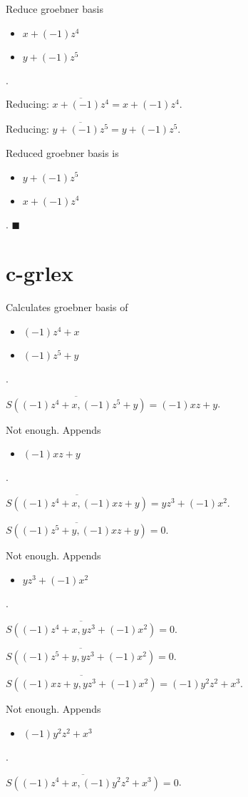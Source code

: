 \documentclass{jsarticle}
\begin{document}
Reduce groebner basis 
\begin{itemize}
\item $x+(-1)z^{4}$
\item $y+(-1)z^{5}$
\end{itemize}  . 


Reducing: $\overline{x+(-1)z^{4}} = x+(-1)z^{4}$.  

Reducing: $\overline{y+(-1)z^{5}} = y+(-1)z^{5}$.  

Reduced groebner basis is 
\begin{itemize}
\item $y+(-1)z^{5}$
\item $x+(-1)z^{4}$
\end{itemize}  . 
$\blacksquare{}$

\section{c-grlex}Calculates groebner basis of 
\begin{itemize}
\item $(-1)z^{4}+x$
\item $(-1)z^{5}+y$
\end{itemize}  . 


$\overline{S((-1)z^{4}+x, (-1)z^{5}+y)} = (-1)xz+y$.  

Not enough.  Appends \begin{itemize}
\item $(-1)xz+y$
\end{itemize}  . 


$\overline{S((-1)z^{4}+x, (-1)xz+y)} = yz^{3}+(-1)x^{2}$.  

$\overline{S((-1)z^{5}+y, (-1)xz+y)} = 0$.  

Not enough.  Appends \begin{itemize}
\item $yz^{3}+(-1)x^{2}$
\end{itemize}  . 


$\overline{S((-1)z^{4}+x, yz^{3}+(-1)x^{2})} = 0$.  

$\overline{S((-1)z^{5}+y, yz^{3}+(-1)x^{2})} = 0$.  

$\overline{S((-1)xz+y, yz^{3}+(-1)x^{2})} = (-1)y^{2}z^{2}+x^{3}$.  

Not enough.  Appends \begin{itemize}
\item $(-1)y^{2}z^{2}+x^{3}$
\end{itemize}  . 


$\overline{S((-1)z^{4}+x, (-1)y^{2}z^{2}+x^{3})} = 0$.  
\end{document}
